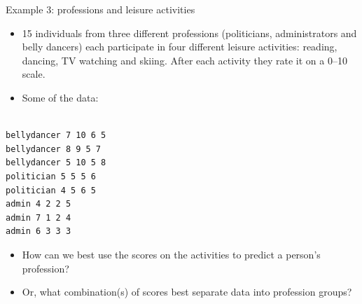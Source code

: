 \documentclass[ignorenonframetext,]{beamer}
\begin{document}
\begin{frame}[fragile]{Example 3: professions and leisure activities}
\protect\hypertarget{example-3-professions-and-leisure-activities}{}

\begin{itemize}
\item
  15 individuals from three different professions (politicians,
  administrators and belly dancers) each participate in four different
  leisure activities: reading, dancing, TV watching and skiing. After
  each activity they rate it on a 0--10 scale.
\item
  Some of the data:
\end{itemize}

\begin{verbatim}

bellydancer 7 10 6 5
bellydancer 8 9 5 7
bellydancer 5 10 5 8
politician 5 5 5 6
politician 4 5 6 5
admin 4 2 2 5
admin 7 1 2 4
admin 6 3 3 3
\end{verbatim}

\begin{itemize}
\item
  How can we best use the scores on the activities to predict a person's
  profession?
\item
  Or, what combination(s) of scores best separate data into profession
  groups?
\end{itemize}

\end{frame}
\end{document}
